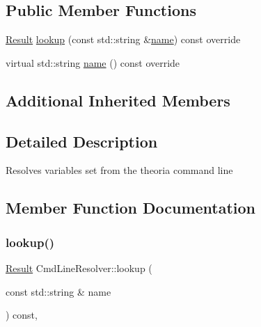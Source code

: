 \subsection*{Public Member Functions}
\begin{DoxyCompactItemize}
\item 
\hyperlink{classtheoria_1_1config_1_1ConfigVariableResolver_af27a85262d802c9ad4ecb1179efaf447}{Result} \hyperlink{classtheoria_1_1config_1_1CmdLineResolver_a6de270bd5855361b368cc082df53a527}{lookup} (const std\+::string \&\hyperlink{classtheoria_1_1config_1_1CmdLineResolver_ab42f0d86e62e985ee0bc94947df46a74}{name}) const override
\item 
virtual std\+::string \hyperlink{classtheoria_1_1config_1_1CmdLineResolver_ab42f0d86e62e985ee0bc94947df46a74}{name} () const override
\end{DoxyCompactItemize}
\subsection*{Additional Inherited Members}


\subsection{Detailed Description}
Resolves variables set from the theoria command line 

\subsection{Member Function Documentation}
\mbox{\label{classtheoria_1_1config_1_1CmdLineResolver_a6de270bd5855361b368cc082df53a527}} 
\subsubsection{\texorpdfstring{lookup()}{lookup()}}
{\footnotesize\ttfamily \hyperlink{classtheoria_1_1config_1_1ConfigVariableResolver_af27a85262d802c9ad4ecb1179efaf447}{Result} Cmd\+Line\+Resolver\+::lookup (\begin{DoxyParamCaption}\item[{const std\+::string \&}]{name }\end{DoxyParamCaption}) const\hspace{0.3cm}{\ttfamily [override]}, {\ttfamily [virtual]}}

